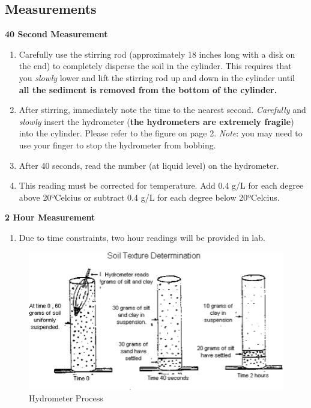 \documentclass[
  letterpaper,
  twocolumn,
  portrait]{scrbook}
\providecommand{\tightlist}{%
  \setlength{\itemsep}{0pt}\setlength{\parskip}{0pt}}\usepackage{longtable,booktabs,array}
\begin{document}
\hypertarget{measurements}{%
\subsection{Measurements}\label{measurements}}

\textbf{40 Second Measurement}

\begin{enumerate}
\def\labelenumi{\arabic{enumi}.}
\item
  Carefully use the stirring rod (approximately 18 inches long with a
  disk on the end) to completely disperse the soil in the cylinder. This
  requires that you \emph{slowly} lower and lift the stirring rod up and
  down in the cylinder until \textbf{all the sediment is removed from
  the bottom of the cylinder.}
\item
  After stirring, immediately note the time to the nearest second.
  \emph{Carefully} and \emph{slowly} insert the hydrometer (\textbf{the
  hydrometers are extremely fragile}) into the cylinder. Please refer to
  the figure on page 2. \emph{Note}: you may need to use your finger to
  stop the hydrometer from bobbing.
\item
  After 40 seconds, read the number (at liquid level) on the hydrometer.
\item
  This reading must be corrected for temperature. Add 0.4 g/L for each
  degree above 20ºCelcius or subtract 0.4 g/L for each degree below
  20ºCelcius.
\end{enumerate}

\textbf{2 Hour Measurement}

\begin{enumerate}
\def\labelenumi{\arabic{enumi}.}
\tightlist
\item
  Due to time constraints, two hour readings will be provided in lab.
\end{enumerate}

\begin{figure}

{\centering \includegraphics{hydrometer-Picture1.png}

}

\caption{\label{fig-hydrometer}Hydrometer Process}

\end{figure}
\end{document}
